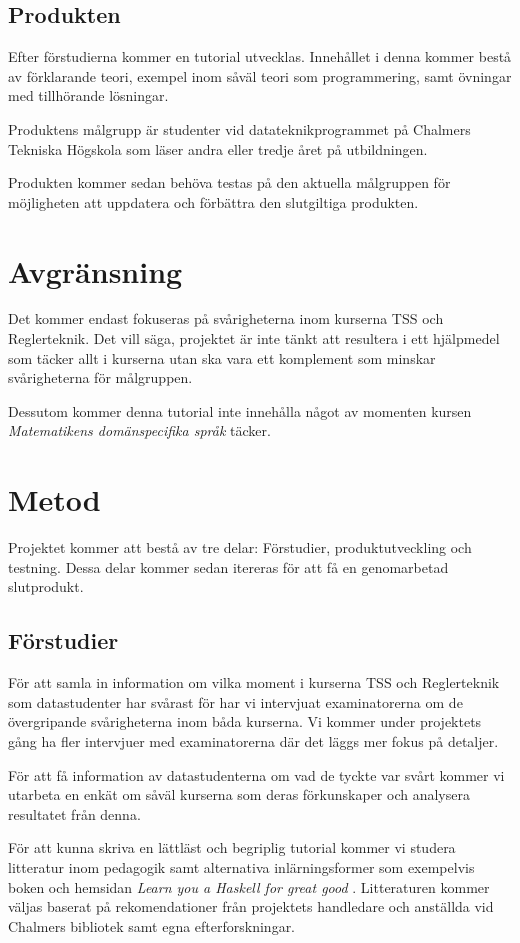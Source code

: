\documentclass{article}
\begin{document}
\subsection{Produkten}
Efter förstudierna kommer en tutorial utvecklas.
Innehållet i denna kommer bestå av förklarande
teori, exempel inom såväl teori som programmering,
samt övningar med tillhörande lösningar.

Produktens målgrupp är studenter vid datateknikprogrammet på
Chalmers Tekniska Högskola som läser andra eller tredje året på utbildningen.

Produkten kommer sedan behöva testas på den aktuella målgruppen för
möjligheten att uppdatera och förbättra den slutgiltiga produkten.

\section{Avgränsning}
Det kommer endast fokuseras på svårigheterna inom kurserna
TSS och Reglerteknik. Det vill säga, projektet är inte tänkt
att resultera i ett hjälpmedel som täcker allt i kurserna
utan ska vara ett komplement som minskar svårigheterna för målgruppen.

Dessutom kommer denna tutorial inte innehålla något av momenten kursen \textit{Matematikens domänspecifika språk} täcker.

\newpage
\section{Metod}
Projektet kommer att bestå av tre delar: Förstudier,
produktutveckling och testning. Dessa delar kommer
sedan itereras för att få en genomarbetad slutprodukt.

\subsection{Förstudier}
För att samla in information om vilka moment i kurserna
TSS och Reglerteknik som datastudenter har svårast för har
vi intervjuat examinatorerna om de övergripande
svårigheterna inom båda kurserna.
Vi kommer under projektets gång ha fler intervjuer med
examinatorerna där det läggs mer fokus på detaljer.

För att få information av datastudenterna om vad de tyckte
var svårt kommer vi utarbeta en enkät om såväl kurserna
som deras förkunskaper och analysera resultatet från denna.

För att kunna skriva en lättläst och begriplig tutorial
kommer vi studera litteratur inom pedagogik samt
alternativa inlärningsformer som exempelvis boken och
hemsidan \textit{Learn you a Haskell for great good} \cite{learnyouahaskell}.
Litteraturen kommer väljas baserat på rekomendationer från
projektets handledare och anställda vid Chalmers bibliotek
samt egna efterforskningar.
\end{document}
